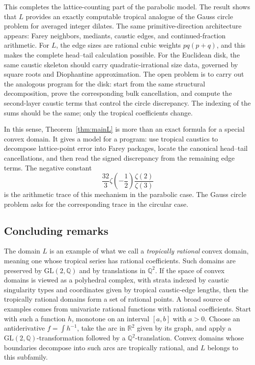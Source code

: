\documentclass[a4paper,american,11pt]{amsart}
\theoremstyle{plain}
\theoremstyle{definition}
\newcommand{\Q}{\mathbb Q}
\newcommand{\R}{\mathbb R}
\begin{document}
This completes the lattice-counting part of the parabolic model. The result
shows that \(L\) provides an exactly computable tropical analogue of the
Gauss circle problem for averaged integer dilates. The same
primitive-direction architecture appears: Farey neighbors, mediants,
caustic edges, and continued-fraction arithmetic. For \(L\), the edge sizes
are rational cubic weights \(pq(p+q)\), and this makes the complete
head--tail calculation possible. For the Euclidean disk, the same caustic
skeleton should carry quadratic-irrational size data, governed by square roots
and Diophantine approximation. The open problem is to carry out the analogous
program for the disk: start from the same structural decomposition, prove the
corresponding bulk cancellation, and compute the second-layer caustic terms
that control the circle discrepancy. The indexing of the sums should be the
same; only the tropical coefficients change.

In this sense, Theorem~\ref{thm:mainL} is more than an exact formula for a
special convex domain. It gives a model for a program: use tropical caustics
to decompose lattice-point error into Farey packages, locate the canonical
head--tail cancellations, and then read the signed discrepancy from the
remaining edge terms. The negative constant
\[
\frac{32}{3}\zeta\!\left(-\frac12\right)\frac{\zeta(2)}{\zeta(3)}
\]
is the arithmetic trace of this mechanism in the parabolic case. The Gauss
circle problem asks for the corresponding trace in the circular case.

\subsection{Concluding remarks}

The domain \(L\) is an example of what we call a
\textit{tropically rational} convex domain, meaning one whose tropical series
has rational coefficients. Such domains are preserved by
\(\mathrm{GL}(2,\Q)\) and by translations in \(\Q^2\). If the space of convex
domains is viewed as a polyhedral complex, with strata indexed by caustic
singularity types and coordinates given by tropical caustic-edge lengths, then
the tropically rational domains form a set of rational points. A broad source
of examples comes from univariate rational functions with rational
coefficients. Start with such a function \(h\), monotone on an interval
\([a,b]\) with \(a>0\). Choose an antiderivative \(f=\int h^{-1}\), take the
arc in \(\R^2\) given by its graph, and apply a
\(\mathrm{GL}(2,\Q)\)-transformation followed by a \(\Q^2\)-translation.
Convex domains whose boundaries decompose into such arcs are tropically
rational, and \(L\) belongs to this subfamily.
\end{document}
